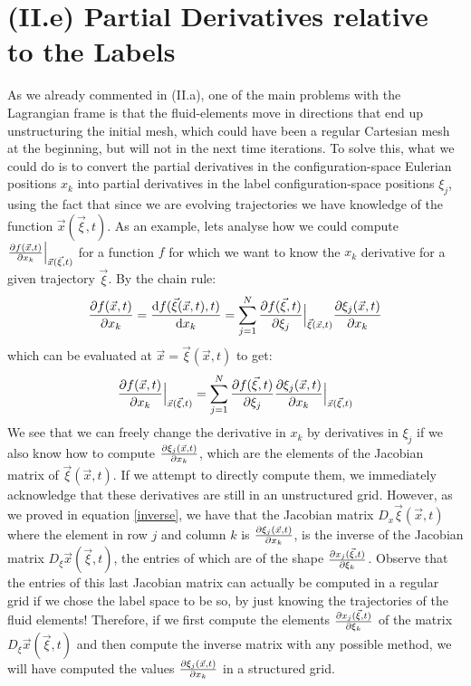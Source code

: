 \documentclass[11pt, a4paper]{article} %
\begin{document}
\section*{(II.e) Partial Derivatives relative to the Labels}
As we already commented in (II.a), one of the main problems with the Lagrangian frame is that the fluid-elements move in directions that end up unstructuring the initial mesh, which could have been a regular Cartesian mesh at the beginning, but will not in the next time iterations. To solve this, what we could do is to convert the partial derivatives in the configuration-space Eulerian positions $x_k$ into partial derivatives in the label configuration-space positions $\xi_j$, using the fact that since we are evolving trajectories we have knowledge of the function $\vec{x}(\vec{\xi},t)$. As an example, lets analyse how we could compute $\pdv{f(\vec{x},t)}{x_k}\Big\rvert_{\vec{x}(\vec{\xi},t)}$ for a function $f$ for which we want to know the $x_k$ derivative for a given trajectory $\vec{\xi}$. By the chain rule:
\begin{equation}
\pdv{f(\vec{x},t)}{x_k}=\dv{f(\vec{\xi}(\vec{x},t),t)}{x_k}=\sum_{j=1}^N \pdv{f(\vec{\xi},t)}{\xi_j}\Big\rvert_{\vec{\xi}(\vec{x},t)} \pdv{\xi_j(\vec{x},t)}{x_k}
\end{equation}
which can be evaluated at $\vec{x}=\vec{\xi}(\vec{x},t)$ to get:
\begin{equation}
\pdv{f(\vec{x},t)}{x_k}\Big\rvert_{\vec{x}(\vec{\xi},t)}=\sum_{j=1}^N \pdv{f(\vec{\xi},t)}{\xi_j} \pdv{\xi_j(\vec{x},t)}{x_k}\Big\rvert_{\vec{x}(\vec{\xi},t)}
\end{equation}
We see that we can freely change the derivative in $x_k$ by derivatives in $\xi_j$ if we also know how to compute $\pdv{\xi_j(\vec{x},t)}{x_k}$, which are the elements of the Jacobian matrix of $\vec{\xi}(\vec{x},t)$. If we attempt to directly compute them, we immediately acknowledge that these derivatives are still in an unstructured grid. However, as we proved in equation \eqref{inverse}, we have that the Jacobian matrix $D_x \vec{\xi}(\vec{x},t)$ where the element in row $j$ and column $k$ is $\pdv{\xi_j(\vec{x},t)}{x_k}$, is the inverse of the Jacobian matrix $D_\xi \vec{x}(\vec{\xi},t)$, the entries of which are of the shape $\pdv{x_j(\vec{\xi},t)}{\xi_k}$. Observe that the entries of this last Jacobian matrix can actually be computed in a regular grid if we chose the label space to be so, by just knowing the trajectories of the fluid elements! Therefore, if we first compute the elements $\pdv{x_j(\vec{\xi},t)}{\xi_k}$ of the matrix $D_\xi \vec{x}(\vec{\xi},t)$ and then compute the inverse matrix with any possible method, we will have computed the values $\pdv{\xi_j(\vec{x},t)}{x_k}$ in a structured grid.
\end{document}
